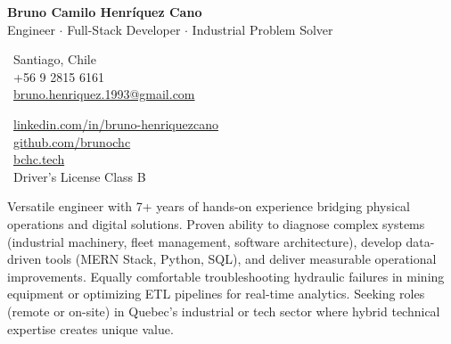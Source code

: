 \documentclass[10pt,letterpaper]{article}
\begin{document}
\begin{center}
    {\Huge \textbf{Bruno Camilo Henríquez Cano}} \\[0.2cm]
    {\Large Engineer $\cdot$ Full-Stack Developer $\cdot$ Industrial Problem Solver}
\end{center}

\vspace{0.3cm}

\noindent
\begin{minipage}[t]{0.5\textwidth}
    \faMapMarker\ Santiago, Chile \\
    \faPhone\ +56 9 2815 6161 \\
    \faEnvelope\ \href{mailto:bruno.henriquez.1993@gmail.com}{bruno.henriquez.1993@gmail.com}
\end{minipage}
\begin{minipage}[t]{0.5\textwidth}
    \faLinkedin\ \href{https://linkedin.com/in/bruno-henriquezcano}{linkedin.com/in/bruno-henriquezcano} \\
    \faGithub\ \href{https://github.com/brunochc}{github.com/brunochc} \\
    \faGlobe\ \href{https://bchc.tech}{bchc.tech} \\
    \faCar\ Driver's License Class B
\end{minipage}

\vspace{0.4cm}


\vspace{0.2cm}

\noindent Versatile engineer with 7+ years of hands-on experience bridging physical operations and digital solutions. Proven ability to diagnose complex systems (industrial machinery, fleet management, software architecture), develop data-driven tools (MERN Stack, Python, SQL), and deliver measurable operational improvements. Equally comfortable troubleshooting hydraulic failures in mining equipment or optimizing ETL pipelines for real-time analytics. Seeking roles (remote or on-site) in Quebec's industrial or tech sector where hybrid technical expertise creates unique value.

\vspace{0.4cm}


\vspace{0.3cm}
\end{document}
